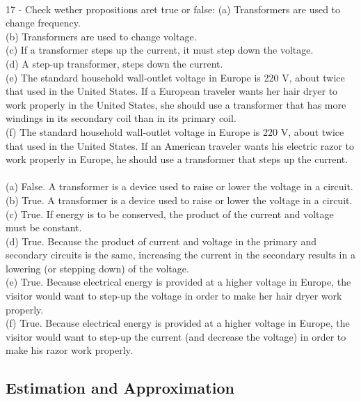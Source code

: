 \documentclass{report}
\begin{document}
\paragraph{}
17 - Check wether propositions aret true or false:
(a) Transformers are used to change frequency.\\
(b) Transformers are used to change voltage.\\
(c) If a transformer steps up the current, it must step down the voltage.\\
(d) A step-up transformer, steps down the current.\\
(e) The standard household wall-outlet voltage in Europe is 220 V, about twice that used in the United States. If a European traveler wants her hair dryer to work properly in the United States, she should use a transformer that has more windings in its secondary coil than in its primary coil.\\
(f) The standard household wall-outlet voltage in Europe is 220 V, about twice that used in the United States. If an American traveler wants his electric razor to work properly in Europe, he should use a transformer that steps up the current.\\
\\
(a) False. A transformer is a device used to raise or lower the voltage in a circuit.\\
(b) True. A transformer is a device used to raise or lower the voltage in a circuit.\\
(c) True. If energy is to be conserved, the product of the current and voltage must be constant.\\
(d) True. Because the product of current and voltage in the primary and secondary circuits is the same, increasing the current in the secondary results in a lowering (or stepping down) of the voltage.\\
(e) True. Because electrical energy is provided at a higher voltage in Europe, the visitor would want to step-up the voltage in order to make her hair dryer work properly.\\
(f) True. Because electrical energy is provided at a higher voltage in Europe, the visitor would want to step-up the current (and decrease the voltage) in order to make his razor work properly. 

\subsection{Estimation and Approximation}
\end{document}
